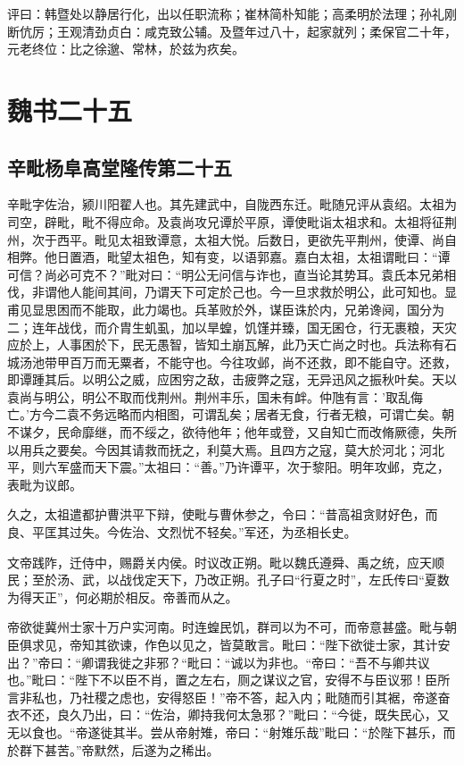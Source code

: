 \documentclass[12pt,UTF8]{ctexbook}
\begin{document}
评曰：韩暨处以静居行化，出以任职流称；崔林简朴知能；高柔明於法理；孙礼刚断伉厉；王观清劲贞白：咸克致公辅。及暨年过八十，起家就列；柔保官二十年，元老终位：比之徐邈、常林，於兹为疚矣。

\part{魏书二十五}
\chapter{辛毗杨阜高堂隆传第二十五}

辛毗字佐治，颍川阳翟人也。其先建武中，自陇西东迁。毗随兄评从袁绍。太祖为司空，辟毗，毗不得应命。及袁尚攻兄谭於平原，谭使毗诣太祖求和。太祖将征荆州，次于西平。毗见太祖致谭意，太祖大悦。后数日，更欲先平荆州，使谭、尚自相弊。他日置酒，毗望太祖色，知有变，以语郭嘉。嘉白太祖，太祖谓毗曰：“谭可信？尚必可克不？”毗对曰：“明公无问信与诈也，直当论其势耳。袁氏本兄弟相伐，非谓他人能间其间，乃谓天下可定於己也。今一旦求救於明公，此可知也。显甫见显思困而不能取，此力竭也。兵革败於外，谋臣诛於内，兄弟谗阋，国分为二；连年战伐，而介胄生虮虱，加以旱蝗，饥馑并臻，国无囷仓，行无裹粮，天灾应於上，人事困於下，民无愚智，皆知土崩瓦解，此乃天亡尚之时也。兵法称有石城汤池带甲百万而无粟者，不能守也。今往攻邺，尚不还救，即不能自守。还救，即谭踵其后。以明公之威，应困穷之敌，击疲弊之寇，无异迅风之振秋叶矣。天以袁尚与明公，明公不取而伐荆州。荆州丰乐，国未有衅。仲虺有言：'取乱侮亡。'方今二袁不务远略而内相图，可谓乱矣；居者无食，行者无粮，可谓亡矣。朝不谋夕，民命靡继，而不绥之，欲待他年；他年或登，又自知亡而改脩厥德，失所以用兵之要矣。今因其请救而抚之，利莫大焉。且四方之寇，莫大於河北；河北平，则六军盛而天下震。”太祖曰：“善。”乃许谭平，次于黎阳。明年攻邺，克之，表毗为议郎。

久之，太祖遣都护曹洪平下辩，使毗与曹休参之，令曰：“昔高祖贪财好色，而良、平匡其过失。今佐治、文烈忧不轻矣。”军还，为丞相长史。

文帝践阼，迁侍中，赐爵关内侯。时议改正朔。毗以魏氏遵舜、禹之统，应天顺民；至於汤、武，以战伐定天下，乃改正朔。孔子曰“行夏之时”，左氏传曰“夏数为得天正”，何必期於相反。帝善而从之。

帝欲徙冀州士家十万户实河南。时连蝗民饥，群司以为不可，而帝意甚盛。毗与朝臣俱求见，帝知其欲谏，作色以见之，皆莫敢言。毗曰：“陛下欲徙士家，其计安出？”帝曰：“卿谓我徙之非邪？“毗曰：“诚以为非也。“帝曰：“吾不与卿共议也。”毗曰：“陛下不以臣不肖，置之左右，厕之谋议之官，安得不与臣议邪！臣所言非私也，乃社稷之虑也，安得怒臣！”帝不答，起入内；毗随而引其裾，帝遂奋衣不还，良久乃出，曰：“佐治，卿持我何太急邪？”毗曰：“今徙，既失民心，又无以食也。“帝遂徙其半。尝从帝射雉，帝曰：“射雉乐哉”毗曰：“於陛下甚乐，而於群下甚苦。”帝默然，后遂为之稀出。
\end{document}

